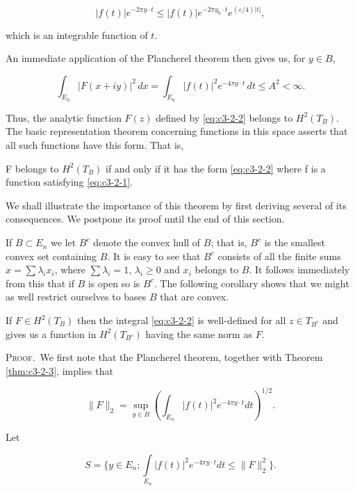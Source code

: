 \[
|f(t)|e^{-2\pi y\cdot t}\le|f(t)|e^{-2\pi y_{0}\cdot t}e^{(\varepsilon/4)|t|},
\]

which is an integrable function of $t$.

An immediate application of the Plancherel theorem then gives us, for $y \in B$,

\[
\int_{E_{n}}|F(x+i y)|^{2}\,d x=\int_{E_{n}}|f(t)|^{2}e^{-4\pi y\cdot t}\,d t\leq A^{2}<\infty.
\]

Thus, the analytic function $F(z)$ defined by \eqref{eq:c3-2-2} belongs to $H^{2}(T_{B})$. The basic representation theorem concerning functions in this space asserts that all such functions have this form. That is,

\begin{theorem}
\label{thm:c3-2-3}
F belongs to $H^{2}(T_{B})$ if and only if it has the form \eqref{eq:c3-2-2} where f is a function satisfying \eqref{eq:c3-2-1}.
\end{theorem}

We shall illustrate the importance of this theorem by first deriving several of its consequences. We postpone its proof until the end of this section.

If $B \subset E_n$ we let $B^c$ denote the convex hull of $B$; that is, $B^c$ is the smallest convex set containing $B$. It is easy to see that $B^c$ consists of all the finite sums $x = \sum \lambda_i x_i$, where $\sum \lambda_i = 1$, $\lambda_i \geq 0$ and $x_i$ belongs to $B$. It follows immediately from this that if $B$ is open so is $B^c$. The following corollary shows that we might as well restrict ourselves to bases $B$ that are convex.

\begin{corollary}
\label{cor:c3-2-4}
If $F \in H^2(T_B)$ then the integral \eqref{eq:c3-2-2} is well-defined for all $z \in T_{B^c}$ and gives us a function in $H^2(T_{B^c})$ having the same norm as $F$.
\end{corollary}

\textsc{Proof.}\ We first note that the Plancherel theorem, together with Theorem \ref{thm:c3-2-3}, implies that

\begin{equation}\label{eq:c3-2-5}
\|F\|_{2}=\sup_{y\in B}\left(\int_{E_{n}}|f(t)|^{2}e^{-4\pi y\cdot t}d t\right)^{1/2}.
\end{equation}

Let

\[
S=\Bigg\{y\in E_{n};\int\limits_{E_{n}}|f(t)|^{2}e^{-4\pi y\cdot t}d t\leq\|F\|_{2}^{2}\Bigg\}.
\]

